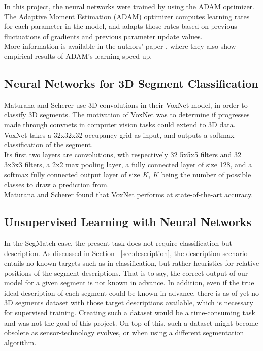 In this project, the neural networks were trained by using the ADAM optimizer. The Adaptive Moment Estimation (ADAM) optimizer computes learning rates for each parameter in the model, and adapts those rates based on previous fluctuations of gradients and previous parameter update values.\\

More information is available in the authors' paper \cite{adam}, where they also show empirical results of ADAM's learning speed-up. 

\subsection{Neural Networks for 3D Segment Classification}
\label{subsec:voxnet}

Maturana and Scherer \cite{voxnet} use 3D convolutions in their VoxNet model, in order to classify 3D segments. The motivation of VoxNet was to determine if progresses made through convnets in computer vision tasks could extend to 3D data.\\

VoxNet takes a 32x32x32 occupancy grid as input, and outputs a softmax classification of the segment.\\

Its first two layers are convolutions, wth respectively 32 5x5x5 filters and 32 3x3x3 filters, a 2x2 max pooling layer, a fully connected layer of size 128, and a softmax fully connected output layer of size $K$, $K$ being the number of possible classes to draw a prediction from.\\

Maturana and Scherer found that VoxNet performs at state-of-the-art accuracy.


\subsection{Unsupervised Learning with Neural Networks}
\label{subsec:autoencoder}

In the SegMatch case, the present task does not require classification but description. As discussed in Section ~\ref{sec:description}, the description scenario entails no known targets such as in classification, but rather heuristics for relative positions of the segment descriptions. That is to say, the correct output of our model for a given segment is not known in advance. In addition, even if the true ideal description of each segment could be known in advance, there is as of yet no 3D segments dataset with those target descriptions available, which is necessary for supervised training. Creating such a dataset would be a time-consuming task and was not the goal of this project. On top of this, such a dataset might become obsolete as sensor-technology evolves, or when using a different segmentation algorithm.\\

